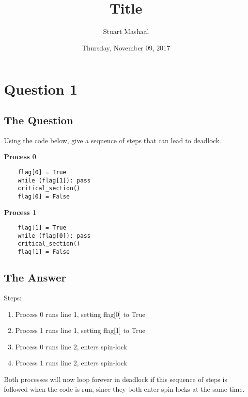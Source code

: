 \documentclass[11pt, letterpaper]{article}
\title{Title}
\author{Stuart Mashaal}
\date{Thursday, November 09, 2017}
\begin{document}
\begin{titlepage}
    \maketitle
\end{titlepage}

\section*{Question 1}
\label{sec:question_1}

\subsection*{The Question}
\label{sub:the_question}

Using the code below, give a sequence of steps that can lead to deadlock. \\

\begin{minipage}{0.5\textwidth}
    \textbf{Process 0}
    \begin{verbatim}
    flag[0] = True
    while (flag[1]): pass
    critical_section()
    flag[0] = False
    \end{verbatim}
\end{minipage}
\begin{minipage}{0.5\textwidth}
    \textbf{Process 1}
    \begin{verbatim}
    flag[1] = True
    while (flag[0]): pass
    critical_section()
    flag[1] = False
    \end{verbatim}
\end{minipage}

\subsection*{The Answer}
\label{sub:the_question}

Steps:

\begin{enumerate}
    \item Process 0 runs line 1, setting flag[0] to True
    \item Process 1 runs line 1, setting flag[1] to True
    \item Process 0 runs line 2, enters spin-lock
    \item Process 1 runs line 2, enters spin-lock
\end{enumerate}

Both processes will now loop forever in deadlock if this sequence of steps is followed when the code is run, since they both enter spin locks at the same time.
\end{document}
